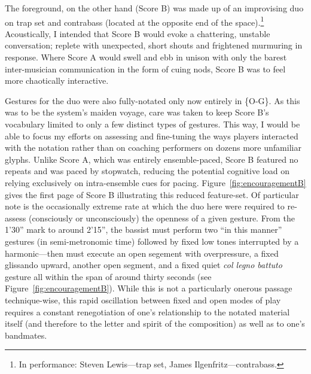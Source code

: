     The foreground, on the other hand (Score B) was made up of an improvising duo on trap set and contrabass (located at the opposite end of the space).\footnote{In performance: Steven Lewis---trap set, James Ilgenfritz---contrabass.} Acoustically, I intended that Score B would evoke a chattering, unstable conversation; replete with unexpected, short shouts and frightened murmuring in response. Where Score A would swell and ebb in unison with only the barest inter-musician communication in the form of cuing nods, Score B was to feel more chaotically interactive.
    
    Gestures for the duo were also fully-notated only now entirely in \{O-G\}. As this was to be the system's maiden voyage, care was taken to keep Score B's vocabulary limited to only a few distinct types of gestures. This way, I would be able to focus my efforts on assessing and fine-tuning the ways players interacted with the notation rather than on coaching performers on dozens more unfamiliar glyphs. Unlike Score A, which was entirely ensemble-paced, Score B featured no repeats and was paced by stopwatch, reducing the potential cognitive load on relying exclusively on intra-ensemble cues for pacing. Figure~\ref{fig:encouragementB} gives the first page of Score B illustrating this reduced feature-set. Of particular note is the occasionally extreme rate at which the duo here were required to re-assess (consciously or unconsciously) the openness of a given gesture. From the 1'30'' mark to around 2'15'', the bassist must perform two ``in this manner'' gestures (in semi-metronomic time) followed by fixed low tones interrupted by a harmonic---then must execute an open segement with overpressure, a fixed glissando upward, another open segment, and a fixed quiet \textit{col legno battuto} gesture all within the span of around thirty seconds (see Figure~\ref{fig:encouragementB}). While this is not a particularly onerous passage technique-wise, this rapid oscillation between fixed and open modes of play requires a constant renegotiation of one's relationship to the notated material itself (and therefore to the letter and spirit of the composition) as well as to one's bandmates.
    
